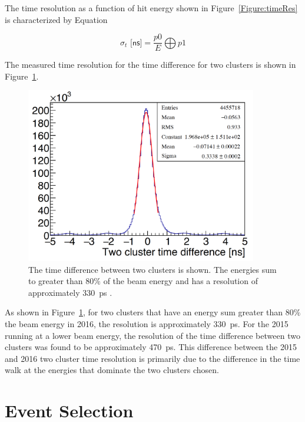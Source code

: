 \documentclass[12pt]{report}
\begin{document}
The time resolution as a function of hit energy shown in Figure~\ref{Figure:timeRes} is characterized by Equation 

\begin{equation}
	\label{eq:twalkEq}
		\sigma_t \textsf{ [ns]} = \dfrac{p0}{E}\bigoplus p1	
\end{equation}

The measured time resolution for the time difference for two clusters is shown in Figure~\ref{Figure:timeRes2cl}.

\begin{figure}[H]
  \centering
      \includegraphics[width=0.9\textwidth]{pics/performance/2clusterTres.png}
  \caption[Time resolution for the time difference between two clusters]{The time difference between two clusters is shown. The energies sum to greater than 80$\%$ of the beam energy and has a resolution of approximately 330~ps .}
  \label{Figure:timeRes2cl}
\end{figure}

As shown in Figure~\ref{Figure:timeRes2cl}, for two clusters that have an energy sum greater than 80$\%$ the beam energy in 2016, the resolution is approximately 330~ps. For the 2015 running at a lower beam energy, the resolution of the time difference between two clusters was found to be approximately 470~ps. This difference between the 2015 and 2016 two cluster time resolution is primarily due to the difference in the time walk at the energies that dominate the two clusters chosen. 

\chapter{Event Selection}
\end{document}
